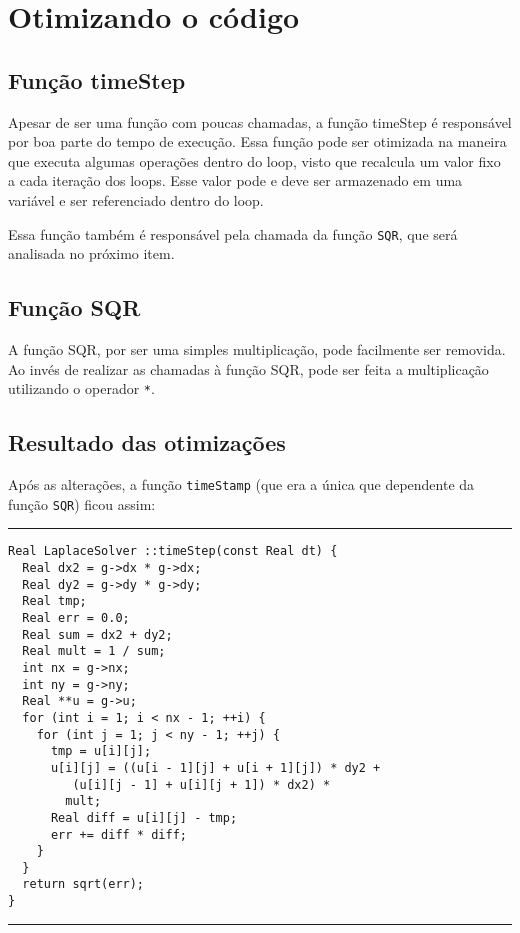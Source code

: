\documentclass[a4paper,twosidep]{article}
\begin{document}
\section{Otimizando o código}
\label{sec:org06151d7}

\subsection{Função timeStep}
\label{sec:org79863e2}
Apesar de ser uma função com poucas chamadas, a função timeStep é responsável por boa parte do tempo de execução. Essa função pode ser otimizada na maneira que executa algumas operações dentro do loop, visto que recalcula um valor fixo a cada iteração dos loops. Esse valor pode e deve ser armazenado em uma variável e ser referenciado dentro do loop.

Essa função também é responsável pela chamada da função \texttt{SQR}, que será analisada no próximo item.

\subsection{Função SQR}
\label{sec:orgb6c965c}
A função SQR, por ser uma simples multiplicação, pode facilmente ser removida. Ao invés de realizar as chamadas à função SQR, pode ser feita a multiplicação utilizando o operador \texttt{*}.

\subsection{Resultado das otimizações}
\label{sec:org2a865f5}
Após as alterações, a função \texttt{timeStamp} (que era a única que dependente da função \texttt{SQR}) ficou assim:

\noindent\rule{\textwidth}{0.5pt}
\begin{verbatim}
Real LaplaceSolver ::timeStep(const Real dt) {
  Real dx2 = g->dx * g->dx;
  Real dy2 = g->dy * g->dy;
  Real tmp;
  Real err = 0.0;
  Real sum = dx2 + dy2;
  Real mult = 1 / sum;
  int nx = g->nx;
  int ny = g->ny;
  Real **u = g->u;
  for (int i = 1; i < nx - 1; ++i) {
    for (int j = 1; j < ny - 1; ++j) {
      tmp = u[i][j];
      u[i][j] = ((u[i - 1][j] + u[i + 1][j]) * dy2 +
		 (u[i][j - 1] + u[i][j + 1]) * dx2) *
		mult;
      Real diff = u[i][j] - tmp;
      err += diff * diff;
    }
  }
  return sqrt(err);
}
\end{verbatim}

\noindent\rule{\textwidth}{0.5pt}
\end{document}
